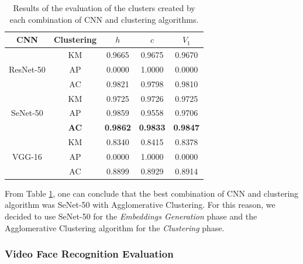 \begin{table}[!ht]
\small
\centering
\caption{Results of the evaluation of the clusters created by each combination of CNN and clustering algorithms.}
\begin{tabular}{@{}ccccc@{}}
\toprule
\textbf{CNN} & \textbf{Clustering} & \textbf{$h$} & \textbf{$c$} & \textbf{$V_1$} \\ \midrule
                  & KM                  & 0.9665                     & 0.9675                      & 0.9670             \\
ResNet-50         & AP                  & 0.0000                     & 1.0000                      & 0.0000             \\
                  & AC                  & 0.9821                     & 0.9798                      & 0.9810             \\ \midrule
                  & KM                  & 0.9725                     & 0.9726                      & 0.9725             \\
SeNet-50          & AP                  & 0.9859                     & 0.9558                      & 0.9706             \\
                  & \textbf{AC}         & \textbf{0.9862}            & \textbf{0.9833}             & \textbf{0.9847}    \\ \midrule
                  & KM                  & 0.8340                     & 0.8415                      & 0.8378             \\
VGG-16            & AP                  & 0.0000                     & 1.0000                      & 0.0000             \\
                  & AC                  & 0.8899                     & 0.8929                      & 0.8914             \\
\end{tabular}
\label{tab:results_clustering}
\vspace{-1em}
\end{table}
From Table \ref{tab:results_clustering}, one can conclude that the best combination of CNN and clustering algorithm was SeNet-50 with Agglomerative Clustering.
For this reason, we decided to use SeNet-50 for the \emph{Embeddings Generation} phase and the Agglomerative Clustering algorithm for the \emph{Clustering} phase.

\subsubsection{Video Face Recognition Evaluation}

